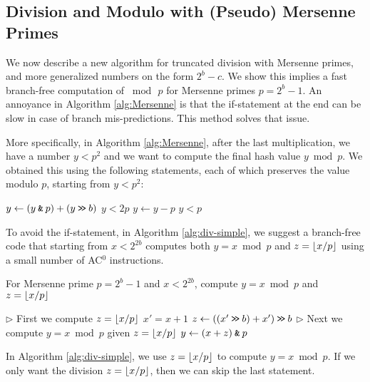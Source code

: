 



\subsection{Division and Modulo with (Pseudo) Mersenne Primes}\label{subsec:intro-division}

We now describe a new algorithm for truncated division with Mersenne primes, and more generalized numbers on the form $2^b-c$.
We show this implies a fast branch-free computation of $\bmod\,p$ for
Mersenne primes $p=2^b-1$.
An annoyance in Algorithm \ref{alg:Mersenne}
is that the if-statement at the end can be slow in case of branch mis-predictions.
This method solves that issue.

More specifically, in Algorithm \ref{alg:Mersenne}, after the last
multiplication, we have a number $y<p^2$ and we want to compute the
final hash value $y\bmod p$. We obtained this using the following
statements, each of which preserves the value modulo $p$, starting from
$y<p^2$:
\begin{algorithmic}
	\State $y \gets (y\mathbin{\texttt{\&}} p)+(y\mathbin{\texttt{>\!>}} b)$
	\Comment $y<2p$
	\State $y\gets y-p$
	\Comment  $y<p$
	\EndIf
\end{algorithmic}
To avoid the if-statement, in Algorithm \ref{alg:div-simple}, we suggest
a branch-free code that starting
from $x<2^{2b}$ computes both $y=x\bmod p$ and $z=\lfloor {x/p} \rfloor$ using
a small number of AC$^0$ instructions.
\begin{algorithm}[H]
	\caption{For Mersenne prime $p=2^b-1$ and $x< 2^{2b}$, compute
		\label{alg:div-simple}
		$y=x\bmod p$ and $z=\lfloor {x/p} \rfloor$}
	\begin{algorithmic}
		\State $\rhd$ First we compute $z=\lfloor {x/p} \rfloor$
		\State $x'=x+1$
		\State $z \gets(( x' \mathbin{\texttt{>\!>}} b)+x')\mathbin{\texttt{>\!>}} b$
		\State $\rhd$ Next we compute $y=x\bmod p$ given $z=\lfloor {x/p} \rfloor$
		\State $y \gets (x + z) \mathbin{\texttt{\&}} p $
	\end{algorithmic}
\end{algorithm}
In Algorithm \ref{alg:div-simple}, we use
$z=\lfloor {x/p} \rfloor$ to compute $y=x\bmod p$. If we only want the
division $z=\lfloor {x/p} \rfloor$, then we can skip the last statement.

